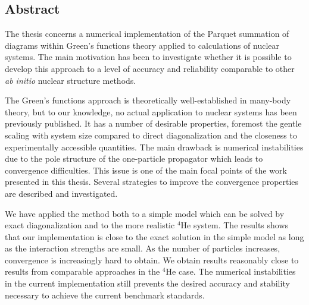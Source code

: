 \documentclass{report}
\begin{document}
\subsection*{Abstract}

The thesis concerns a numerical implementation of the Parquet summation of diagrams within Green's functions theory applied to calculations of nuclear systems. The main motivation has been to investigate whether it is possible to develop this approach to a level of accuracy and reliability comparable to other {\it ab initio} nuclear structure methods. 

The Green's functions approach is theoretically well-established in many-body theory, but to our knowledge, no actual application to nuclear systems has been previously published. It has a number of desirable properties, foremost the gentle scaling with system size compared to direct diagonalization and the closeness to experimentally accessible quantities. The main drawback is numerical instabilities due to the pole structure of the one-particle propagator which leads to convergence difficulties. This issue is one of the main focal points of the work presented in this thesis. Several strategies to improve the convergence properties are described and investigated.

We have applied the method both to a simple model which can be solved by exact diagonalization and to the more realistic ${}^4$He system. The results shows that our implementation is close to the exact solution in the simple model as long as the interaction strengths are small. As the number of particles increases, convergence is increasingly hard to obtain. We obtain results reasonably close to results from comparable approaches in the ${}^4$He case. The numerical instabilities in the current implementation still prevents the desired accuracy and stability necessary to achieve the current benchmark standards. 
\end{document}
